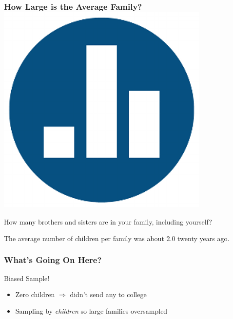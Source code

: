 \begin{frame}
\frametitle{How Large is the Average Family? \hfill\includegraphics[scale = 0.05]{./images/clicker}}

\Large How many brothers and sisters are in your family, including yourself?

\end{frame}

\begin{frame}
\Large
\alert{The average number of children per family was about 2.0 twenty years ago.}
\end{frame}
\begin{frame}
\frametitle{What's Going On Here?}
\pause
Biased Sample!
\begin{itemize}
 	\item  Zero children $\Rightarrow$ didn't send any to college
 	\item Sampling by \emph{children} so large families \alert{oversampled}
\end{itemize}


\end{frame}

